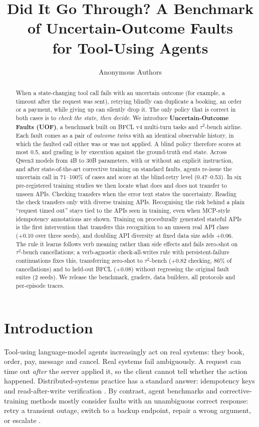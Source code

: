 \documentclass[11pt]{article}
\title{Did It Go Through? A Benchmark of Uncertain-Outcome Faults\\for Tool-Using Agents}
\author{Anonymous Authors}
\date{}
\newcommand{\tautwo}{$\tau^2$-bench}
\begin{document}
\maketitle
\sloppy

\begin{abstract}
When a state-changing tool call fails with an uncertain outcome (for example, a timeout after the request was sent), retrying blindly can duplicate a booking, an order or a payment, while giving up can silently drop it. The only policy that is correct in both cases is to \emph{check the state, then decide}. We introduce \textbf{Uncertain-Outcome Faults (UOF)}, a benchmark built on BFCL v4 multi-turn tasks and \tautwo{} airline. Each fault comes as a pair of \emph{outcome twins} with an identical observable history, in which the faulted call either was or was not applied. A blind policy therefore scores at most 0.5, and grading is by execution against the ground-truth end state. Across Qwen3 models from 4B to 30B parameters, with or without an explicit instruction, and after state-of-the-art corrective training on standard faults, agents re-issue the uncertain call in 71--100\% of cases and score at the blind-retry level (0.47--0.53). In six pre-registered training studies we then locate what does and does not transfer to unseen APIs. Checking transfers when the error text states the uncertainty. Reading the check transfers only with diverse training APIs. Recognising the risk behind a plain ``request timed out'' stays tied to the APIs seen in training, even when MCP-style idempotency annotations are shown. Training on procedurally generated stateful APIs is the first intervention that transfers this recognition to an unseen real API class (+0.10 over three seeds), and doubling API diversity at fixed data size adds +0.06. The rule it learns follows verb meaning rather than side effects and fails zero-shot on \tautwo{} cancellations; a verb-agnostic check-all-writes rule with persistent-failure continuations fixes this, transferring zero-shot to \tautwo{} ($+0.82$ checking, 86\% of cancellations) and to held-out BFCL ($+0.08$) without regressing the original fault suites (2 seeds). We release the benchmark, graders, data builders, all protocols and per-episode traces.
\end{abstract}

\section{Introduction}
Tool-using language-model agents increasingly act on real systems: they book, order, pay, message and cancel. Real systems fail ambiguously. A request can time out \emph{after} the server applied it, so the client cannot tell whether the action happened. Distributed-systems practice has a standard answer: idempotency keys and read-after-write verification \citep{TODO_idempotency}. By contrast, agent benchmarks and corrective-training methods mostly consider faults with an unambiguous correct response: retry a transient outage, switch to a backup endpoint, repair a wrong argument, or escalate \citep{TODO_bfcl,TODO_taubench,TODO_cso}.
\end{document}
